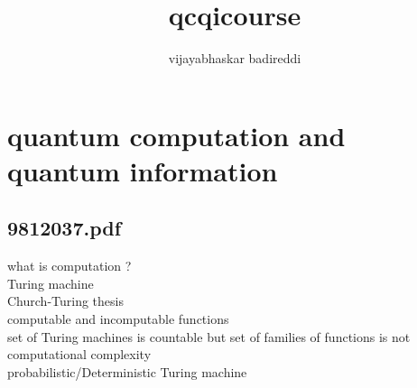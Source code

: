 \documentclass[12pt] {article}
\title{qcqicourse}
\author{vijayabhaskar badireddi}
\begin{document}
        
\section*{quantum computation and quantum information}
\subsection*{9812037.pdf}
what is computation ?\\
Turing machine\\
Church-Turing thesis\\
computable and incomputable functions\\
set of Turing machines is countable but set of families of functions is not\\
computational complexity\\
probabilistic/Deterministic Turing machine
\end{document}
